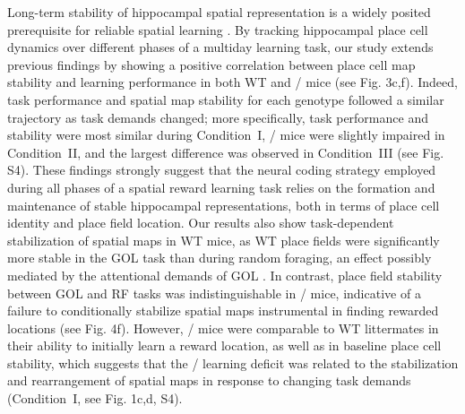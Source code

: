 Long-term stability of hippocampal spatial representation is a widely posited prerequisite for reliable spatial learning \citep{Kentros2004, Lever2002b, Mankin2012, Thompson1990, Ziv2013}. By tracking hippocampal place cell dynamics over different phases of a multiday learning task, our study extends previous findings by showing a positive correlation between place cell map stability and learning performance in both WT and \df/ mice (see Fig. 3c,f). Indeed, task performance and spatial map stability for each genotype followed a similar trajectory as task demands changed; more specifically, task performance and stability were most similar during Condition~I, \df/ mice were slightly impaired in Condition~II, and the largest difference was observed in Condition~III (see Fig. S4). These findings strongly suggest that the neural coding strategy employed during all phases of a spatial reward learning task relies on the formation and maintenance of stable hippocampal representations, both in terms of place cell identity and place field location. Our results also show task-dependent stabilization of spatial maps in WT mice, as WT place fields were significantly more stable in the GOL task than during random foraging, an effect possibly mediated by the attentional demands of GOL \citep{Kentros2004, Kobayashi1997, Markus1995, Monaco2014}. In contrast, place field stability between GOL and RF tasks was indistinguishable in \df/ mice, indicative of a failure to conditionally stabilize spatial maps instrumental in finding rewarded locations (see Fig. 4f). However, \df/ mice were comparable to WT littermates in their ability to initially learn a reward location, as well as in baseline place cell stability, which suggests that the \df/ learning deficit was related to the stabilization and rearrangement of spatial maps in response to changing task demands (Condition~I, see Fig. 1c,d, S4).

